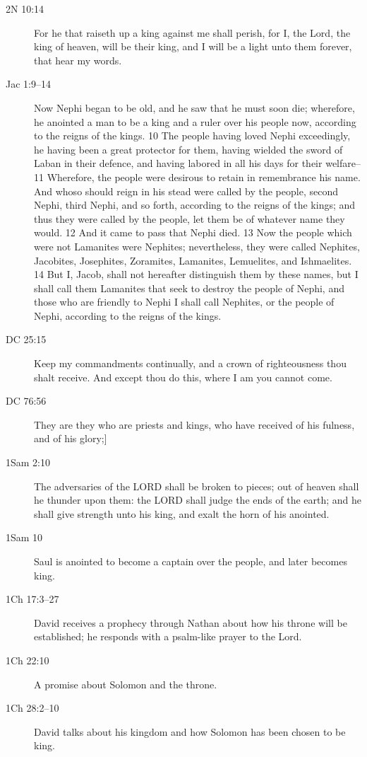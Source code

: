 		\begin{description}
		\item[2N 10:14] For he that raiseth up a king against me shall perish, for I, the Lord, the king of heaven, will be their king, and I will be a light unto them forever, that hear my words.
		\item[Jac 1:9--14] Now Nephi began to be old, and he saw that he must soon die; wherefore, he anointed a man to be a king and a ruler over his people now, according to the reigns of the kings. 10 The people having loved Nephi exceedingly, he having been a great protector for them, having wielded the sword of Laban in their defence, and having labored in all his days for their welfare--11 Wherefore, the people were desirous to retain in remembrance his name. And whoso should reign in his stead were called by the people, second Nephi, third Nephi, and so forth, according to the reigns of the kings; and thus they were called by the people, let them be of whatever name they would. 12 And it came to pass that Nephi died. 13 Now the people which were not Lamanites were Nephites; nevertheless, they were called Nephites, Jacobites, Josephites, Zoramites, Lamanites, Lemuelites, and Ishmaelites. 14 But I, Jacob, shall not hereafter distinguish them by these names, but I shall call them Lamanites that seek to destroy the people of Nephi, and those who are friendly to Nephi I shall call Nephites, or the people of Nephi, according to the reigns of the kings.
		\item[DC 25:15] Keep my commandments continually, and a crown of righteousness thou shalt receive. And except thou do this, where I am you cannot come.
		\item[DC 76:56] They are they who are priests and kings, who have received of his fulness, and of his glory;]
		\item[1Sam 2:10] The adversaries of the LORD shall be broken to pieces; out of heaven shall he thunder upon them: the LORD shall judge the ends of the earth; and he shall give strength unto his king, and exalt the horn of his anointed.
		\item[1Sam 10] Saul is anointed to become a captain over the people, and later becomes king.
		\item[1Ch 17:3--27] David receives a prophecy through Nathan about how his throne will be established; he responds with a psalm-like prayer to the Lord.
		\item[1Ch 22:10] A promise about Solomon and the throne.
		\item[1Ch 28:2--10] David talks about his kingdom and how Solomon has been chosen to be king.

\end{description}
